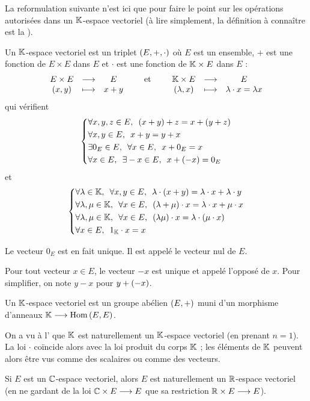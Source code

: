 \begin{reform}[Concrète]
La reformulation suivante n'est ici que pour faire le point sur les opérations autorisées dans un \(\mathbb{K}\)-espace vectoriel (à lire simplement, la définition à connaître est la ).

Un \(\mathbb{K}\)-espace vectoriel est un triplet \(\corps{E}[+][\cdot]\) où \(E\) est un ensemble, \(+\) est une fonction de \(E\times E\) dans \(E\) et \(\cdot\) est une fonction de \(\mathbb{K}\times E\) dans \(E\) : \[\begin{array}[t]{ccc}E\times E & \longrightarrow & E \\ \left(x,y\right) & \longmapsto & x+y\end{array}\qquad\text{et}\qquad\begin{array}[t]{ccc}\mathbb{K}\times E & \longrightarrow & E \\ \left(\lambda,x\right) & \longmapsto & \lambda\cdot x=\lambda x\end{array}\] qui vérifient \[\begin{dcases}
\quantifs{\forall x,y,z\in E}\paren{x+y}+z=x+\paren{y+z} \\
\quantifs{\forall x,y\in E}x+y=y+x \\
\quantifs{\exists0_E\in E;\forall x\in E}x+0_E=x \\
\quantifs{\forall x\in E;\exists-x\in E}x+\paren{-x}=0_E
\end{dcases}\] et \[\begin{dcases}
\quantifs{\forall\lambda\in\K;\forall x,y\in E}\lambda\cdot\paren{x+y}=\lambda\cdot x+\lambda\cdot y \\
\quantifs{\forall\lambda,\mu\in\K;\forall x\in E}\paren{\lambda+\mu}\cdot x=\lambda\cdot x+\mu\cdot x \\
\quantifs{\forall\lambda,\mu\in\K;\forall x\in E}\paren{\lambda\mu}\cdot x=\lambda\cdot\paren{\mu\cdot x} \\
\quantifs{\forall x\in E}1_\K\cdot x=x
\end{dcases}\]

Le vecteur \(0_E\) est en fait unique. Il est appelé le vecteur nul de \(E\).

Pour tout vecteur \(x\in E\), le vecteur \(-x\) est unique et appelé l'opposé de \(x\). Pour simplifier, on note \(y-x\) pour \(y+\left(-x\right)\).
\end{reform}

\begin{reform}[Abstraite]
Un \(\mathbb{K}\)-espace vectoriel est un groupe abélien \(\groupe{E}\) muni d'un morphisme d'anneaux \(\mathbb{K}\longrightarrow\operatorname{Hom}\left(E,E\right)\).
\end{reform}

\begin{rem}
On a vu à l' que \(\mathbb{K}\) est naturellement un \(\mathbb{K}\)-espace vectoriel (en prenant \(n=1\)). La loi \(\cdot\) coïncide alors avec la loi produit du corps \(\mathbb{K}\) ; les éléments de \(\mathbb{K}\) peuvent alors être vus comme des scalaires ou comme des vecteurs.

Si \(E\) est un \(\mathbb{C}\)-espace vectoriel, alors \(E\) est naturellement un \(\mathbb{R}\)-espace vectoriel (en ne gardant de la loi \(\mathbb{C}\times E\longrightarrow E\) que sa restriction \(\mathbb{R}\times E\longrightarrow E\)).
\end{rem}

